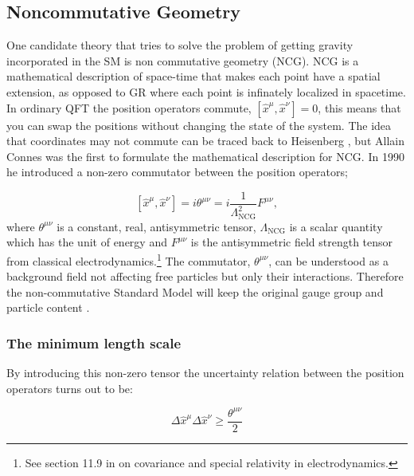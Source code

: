 \subsection{Noncommutative Geometry}
One candidate theory that tries to solve the problem of getting gravity incorporated in the SM is non commutative geometry (NCG). NCG is a mathematical description of space-time that makes each point have a spatial extension, as opposed to GR where each point is infinately localized in spacetime. In ordinary QFT the position operators commute, $[ \hat x^{\mu}, \hat x^{\nu}] = 0$, this means that you can swap the positions without changing the state of the system. The idea that coordinates may not commute can be traced back to Heisenberg \cite{snyder1947qst}, but Allain Connes \cite{connes1991pma} was the first to formulate the mathematical description for NCG. In 1990 he introduced a non-zero commutator between the position operators; \cite{rosendahl2008} 

\begin{equation} \label{eq:ncgtheta}
	[ \hat x^{\mu}, \hat x^{\nu}] = i \theta^{\mu \nu} = i \frac{1}{\Lambda_{\textrm{NCG}}^2} F^{\mu\nu},
\end{equation}
where $\theta^{\mu \nu}$ is a constant, real, antisymmetric tensor, $\Lambda_{\textrm{NCG}}$ is a scalar quantity which has the unit of energy and $F^{\mu\nu}$ is the antisymmetric field strength tensor from classical electrodynamics.\footnote{See section 11.9 in \cite{jackson1975cew} on covariance and special relativity in electrodynamics.} The commutator, $\theta^{\mu \nu}$, can be understood as a background field not affecting free particles but only their interactions. Therefore the non-commutative Standard Model will keep the original gauge group and particle content \cite{rosendahl2008}.

\subsubsection{The minimum length scale}
By introducing this non-zero tensor the uncertainty relation between the position operators turns out to be:

\begin{equation}
\Delta \hat x^{\mu} \Delta \hat x^{\nu} \ge \frac{\theta^{\mu \nu}}{2}
\end{equation}

